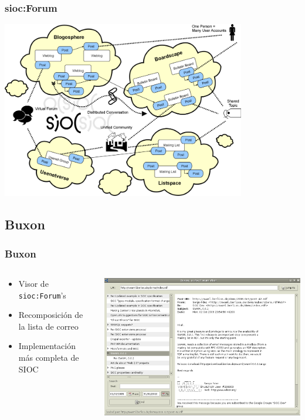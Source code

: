 \documentclass[spanish,notes=hide]{beamer}
\begin{document}
\frame
{
  \frametitle{sioc:Forum}
  \begin{center}
    \includegraphics[width=0.8\textwidth]{images/sioc-discussions.png}
  \end{center}
}

\subsection{Buxon}
\frame
{
  \frametitle{Buxon}


  \begin{columns}
   \begin{column}{0.32\textwidth}
	\begin{itemize}
	  \item Visor de \texttt{sioc:Forum}'s
	  \item Recomposición de la lista de correo
	  \item Implementación más completa de SIOC
	\end{itemize}
   \end{column}
   \begin{column}{0.68\textwidth}
	\includegraphics[width=\textwidth]{images/buxon.png}
   \end{column}
  \end{columns}
}
\end{document}
